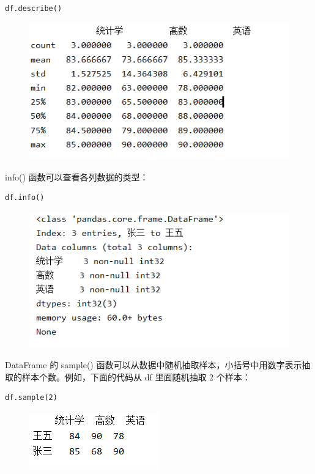 \begin{lstlisting}[Language=Python]
df.describe()
\end{lstlisting}

\begin{figure}[!ht]
\centering
  \includegraphics[scale=0.7]{figure/chapter2/pandas3.png}
\end{figure}

info() 函数可以查看各列数据的类型：

\begin{lstlisting}[Language=Python]
df.info()
\end{lstlisting}

\begin{figure}[!ht]
\centering
  \includegraphics[scale=0.8]{figure/chapter2/pandas4.png}
\end{figure}

DataFrame 的 sample() 函数可以从数据中随机抽取样本，小括号中用数字表示抽取的样本个数。例如，下面的代码从 df 里面随机抽取 2 个样本：
\begin{lstlisting}[Language=Python]
df.sample(2)
\end{lstlisting}

\begin{figure}[!ht]
\centering
  \includegraphics[scale=0.8]{figure/chapter2/pandas8.png}
\end{figure}

